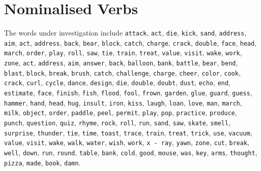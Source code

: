 \documentclass[a4paper,12pt,twoside,openright]{report}
\begin{document}
\section{Nominalised Verbs}\label{section:frozen_verbs}
The words under investigation include
\Verb#attack#, \Verb#act#, \Verb#die#, \Verb#kick#, \Verb#sand#, \Verb#address#, \Verb#aim#, \Verb#act#, \Verb#address#, \Verb#back#, \Verb#bear#, \Verb#block#, \Verb#catch#, \Verb#charge#, \Verb#crack#, \Verb#double#, \Verb#face#, \Verb#head#, \Verb#march#, \Verb#order#, \Verb#play#, \Verb#roll#, \Verb#saw#, \Verb#tie#, \Verb#train#, \Verb#treat#, \Verb#value#, \Verb#visit#, \Verb#wake#, \Verb#work#, \Verb#zone#, \Verb#act#, \Verb#address#, \Verb#aim#, \Verb#answer#, \Verb#back#, \Verb#balloon#, \Verb#bank#, \Verb#battle#, \Verb#bear#, \Verb#bend#, \Verb#blast#, \Verb#block#, \Verb#break#, \Verb#brush#, \Verb#catch#, \Verb#challenge#, \Verb#charge#, \Verb#cheer#, \Verb#color#, \Verb#cook#, \Verb#crack#, \Verb#curl#, \Verb#cycle#, \Verb#dance#, \Verb#design#, \Verb#die#, \Verb#double#, \Verb#doubt#, \Verb#dust#, \Verb#echo#, \Verb#end#, \Verb#estimate#, \Verb#face#, \Verb#finish#, \Verb#fish#, \Verb#flood#, \Verb#fool#, \Verb#frown#, \Verb#garden#, \Verb#glue#, \Verb#guard#, \Verb#guess#, \Verb#hammer#, \Verb#hand#, \Verb#head#, \Verb#hug#, \Verb#insult#, \Verb#iron#, \Verb#kiss#, \Verb#laugh#, \Verb#loan#, \Verb#love#, \Verb#man#, \Verb#march#, \Verb#milk#, \Verb#object#, \Verb#order#, \Verb#paddle#, \Verb#peel#, \Verb#permit#, \Verb#play#, \Verb#pop#, \Verb#practice#, \Verb#produce#, \Verb#punch#, \Verb#question#, \Verb#quiz#, \Verb#rhyme#, \Verb#rock#, \Verb#roll#, \Verb#run#, \Verb#sand#, \Verb#saw#, \Verb#skate#, \Verb#smell#, \Verb#surprise#, \Verb#thunder#, \Verb#tie#, \Verb#time#, \Verb#toast#, \Verb#trace#, \Verb#train#, \Verb#treat#, \Verb#trick#, \Verb#use#, \Verb#vacuum#, \Verb#value#, \Verb#visit#, \Verb#wake#, \Verb#walk#, \Verb#water#, \Verb#wish#, \Verb#work#, \Verb#x - ray#, \Verb#yawn#, \Verb#zone#, \Verb#cut#, \Verb#break#, \Verb#well#, \Verb#down#, \Verb#run#, \Verb#round#, \Verb#table#, \Verb#bank#, \Verb#cold#, \Verb#good#, \Verb#mouse#, \Verb#was#, \Verb#key#, \Verb#arms#, \Verb#thought#, \Verb#pizza#, \Verb#made#, \Verb#book#, \Verb#damn#.
\end{document}
